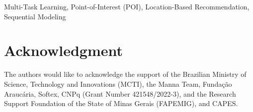 \documentclass[conference]{IEEEtran}
\begin{document}
\begin{IEEEkeywords}
Multi-Task Learning, Point-of-Interest (POI), Location-Based Recommendation, Sequential Modeling
\end{IEEEkeywords}


%
%


%
%


%
%


%
%


%
%


\section*{Acknowledgment} 
The authors would like to acknowledge the support of the Brazilian Ministry of Science, Technology and Innovations (MCTI), the Manna Team, Fundação Araucária, Softex, CNPq (Grant Number 421548/2022-3), and the Research Support Foundation of the State of Minas Gerais (FAPEMIG), and CAPES.

%
%


\end{document}
